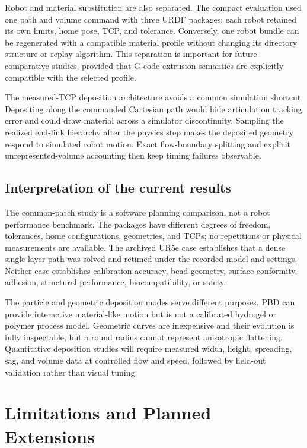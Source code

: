 \documentclass[letterpaper,10pt,conference]{ieeeconf}
\begin{document}
Robot and material substitution are also separated.  The compact evaluation
used one path and volume command with three URDF packages; each robot retained
its own limits, home pose, TCP, and tolerance.  Conversely, one robot bundle can
be regenerated with a compatible material profile without changing its
directory structure or replay algorithm.  This separation is important for
future comparative studies, provided that G-code extrusion semantics are
explicitly compatible with the selected profile.

The measured-TCP deposition architecture avoids a common simulation shortcut.
Depositing along the commanded Cartesian path would hide articulation tracking
error and could draw material across a simulator discontinuity.  Sampling the
realized end-link hierarchy after the physics step makes the deposited geometry
respond to simulated robot motion.  Exact flow-boundary splitting and explicit
unrepresented-volume accounting then keep timing failures observable.

\subsection{Interpretation of the current results}

The common-patch study is a software planning comparison, not a robot
performance benchmark.  The packages have different degrees of freedom,
tolerances, home configurations, geometries, and TCPs; no repetitions or
physical measurements are available.  The archived UR5e case establishes that
a dense single-layer path was solved and retimed under the recorded model and
settings.  Neither case establishes calibration accuracy, bead geometry,
surface conformity, adhesion, structural performance, biocompatibility, or
safety.

The particle and geometric deposition modes serve different purposes.  PBD can
provide interactive material-like motion but is not a calibrated hydrogel or
polymer process model.  Geometric curves are inexpensive and their evolution is
fully inspectable, but a round radius cannot represent anisotropic flattening.
Quantitative deposition studies will require measured width, height, spreading,
sag, and volume data at controlled flow and speed, followed by held-out
validation rather than visual tuning.

\section{Limitations and Planned Extensions}
\end{document}
